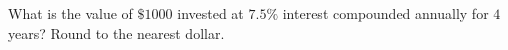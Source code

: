 What is the value of $\$1000$ invested at $7.5\%$ interest compounded annually for $4$ years? Round to the nearest dollar.

